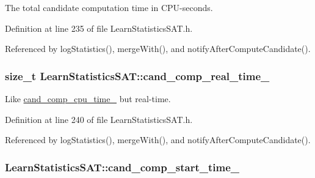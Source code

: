 The total candidate computation time in C\-P\-U-\/seconds. 



Definition at line 235 of file Learn\-Statistics\-S\-A\-T.\-h.



Referenced by log\-Statistics(), merge\-With(), and notify\-After\-Compute\-Candidate().

\hypertarget{classLearnStatisticsSAT_a278872231b15ff010ae4e3a60e8d8f11}{
\subsubsection[{cand\-\_\-comp\-\_\-real\-\_\-time\-\_\-}]{\setlength{\rightskip}{0pt plus 5cm}size\-\_\-t Learn\-Statistics\-S\-A\-T\-::cand\-\_\-comp\-\_\-real\-\_\-time\-\_\-\hspace{0.3cm}{\ttfamily [protected]}}}\label{classLearnStatisticsSAT_a278872231b15ff010ae4e3a60e8d8f11}


Like \hyperlink{classLearnStatisticsSAT_af977c00fbf0f9978f92dd5c997577a06}{cand\-\_\-comp\-\_\-cpu\-\_\-time\-\_\-} but real-\/time. 



Definition at line 240 of file Learn\-Statistics\-S\-A\-T.\-h.



Referenced by log\-Statistics(), merge\-With(), and notify\-After\-Compute\-Candidate().

\hypertarget{classLearnStatisticsSAT_a73f2f0e2ee619df05b22261e7b691320}{
\subsubsection[{cand\-\_\-comp\-\_\-start\-\_\-time\-\_\-}]{ Learn\-Statistics\-S\-A\-T\-::cand\-\_\-comp\-\_\-start\-\_\-time\-\_\-\hspace{0.3cm}{\ttfamily [protected]}}}\label{classLearnStatisticsSAT_a73f2f0e2ee619df05b22261e7b691320}


